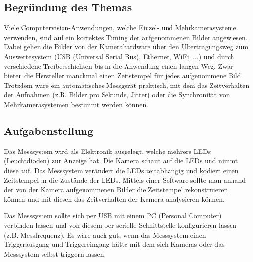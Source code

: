 



\subsection{Begründung des Themas} %

Viele Computervision-Anwendungen, welche Einzel- und Mehrkamerasysteme verwenden, sind auf ein korrektes Timing der aufgenommenen Bilder angewiesen.
Dabei gehen die Bilder von der Kamerahardware über den Übertragungsweg zum Auswertesystem (USB (Universal Serial Bus), Ethernet, WiFi, ...) und durch verschiedene Treiberschichten bis in die Anwendung einen langen Weg.
Zwar bieten die Hersteller manchmal einen Zeitstempel für jedes aufgenommene Bild.
Trotzdem wäre ein automatisches Messgerät praktisch, mit dem das Zeitverhalten der Aufnahmen (z.B. Bilder pro Sekunde, Jitter) oder die Synchronität von Mehrkamerasystemen bestimmt werden können.


\subsection{Aufgabenstellung} %

Das Messsystem wird als Elektronik ausgelegt, welche mehrere LEDs (Leuchtdioden) zur Anzeige hat.
Die Kamera schaut auf die LEDs und nimmt diese auf.
Das Messsystem verändert die LEDs zeitabhängig und kodiert einen Zeitstempel in die Zustände der LEDs.
Mittels einer Software sollte man anhand der von der Kamera aufgenommenen Bilder die Zeitstempel rekonstruieren können und mit diesen das Zeitverhalten der Kamera analysieren können.

Das Messsystem sollte sich per USB mit einem PC (Personal Computer) verbinden lassen und von diesem per serielle Schnittstelle konfigurieren lassen (z.B. Messfrequenz).
Es wäre auch gut, wenn das Messsystem einen Triggerausgang und Triggereingang hätte mit dem sich Kameras oder das Messsystem selbst triggern lassen.

